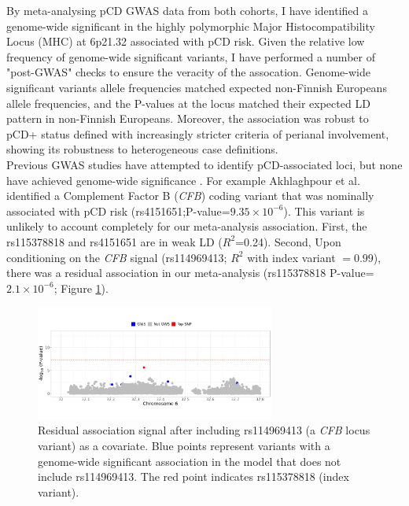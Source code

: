 By meta-analysing pCD GWAS data from both cohorts, I have identified a genome-wide significant in the highly polymorphic Major Histocompatibility Locus (MHC) at 6p21.32 associated with pCD risk. Given the relative low frequency of genome-wide significant variants, I have performed a number of "post-GWAS" checks to ensure the veracity of the assocation. Genome-wide significant variants allele frequencies matched expected non-Finnish Europeans allele frequencies, and the P-values at the locus matched their expected LD pattern in non-Finnish Europeans. Moreover, the association was robust to pCD+ status defined with increasingly stricter criteria of perianal involvement, showing its robustness to heterogeneous case definitions. \\

Previous GWAS studies have attempted to identify pCD-associated loci, but none have achieved genome-wide significance \cite{Akhlaghpour2023-jw,Kaur2016-ut}. For example Akhlaghpour et al. identified a Complement Factor B (\textit{CFB}) coding variant that was nominally associated with pCD risk (rs4151651;P-value=$9.35\times10^{-6}$). This variant is unlikely to account completely for our meta-analysis association. First, the rs115378818 and rs4151651 are in weak LD ($R^{2}$=0.24). Second, Upon conditioning on the \textit{CFB} signal (rs114969413; $R^{2}$ with index variant $=0.99$), there was a residual association in our meta-analysis (rs115378818 P-value=$2.1\times10^{-6}$; Figure \ref{fig:cond_mcgovern}). \\

\begin{figure}
  \centering    
  \includegraphics[width=0.7\textwidth]{Vector/cond_mcgovern_regional_assoc_plot}
  \caption[Figure]{Residual association signal after including  rs114969413 (a \textit{CFB} locus variant) as a covariate. Blue points represent variants with a genome-wide significant association in the model that does not include rs114969413. The red point indicates rs115378818 (index variant).}
  \label{fig:cond_mcgovern}
  \end{figure}


